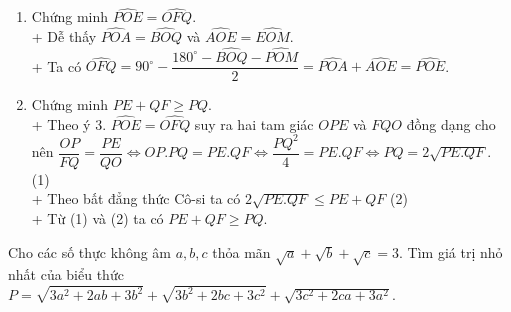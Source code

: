 \begin{ex}
{\begin{enumerate}
+ Từ (1) và (2) ta có $CH.CO = CM.CN$.
\item  Chứng minh $\widehat {POE} =\widehat{OFQ}$. \\
+ Dễ thấy $\widehat{POA}=\widehat{BOQ}$ và $\widehat{AOE} = \widehat{EOM}$. \\
+ Ta có $\widehat{OFQ} = 90^{\circ} - \dfrac{180^{\circ} - \widehat{BOQ}-  \widehat{POM}}{2} = 
\widehat{POA} + \widehat{AOE} = \widehat{POE}$. 
\item Chứng minh  $PE +QF \geq PQ$. \\
+ Theo ý 3. $\widehat {POE} =\widehat{OFQ}$ suy ra hai tam giác $OPE$ và $FQO$ đồng dạng cho nên 
$\dfrac{OP}{FQ} = \dfrac{PE}{QO} \iff  OP.PQ = PE.QF \iff \dfrac{PQ^2}{4} = PE.QF \iff PQ = 2\sqrt{PE.QF}. $
  (1) \\
+ Theo bất đẳng thức Cô-si ta có $2\sqrt{PE.QF} \leq PE+QF$ (2) \\
+ Từ (1) và (2) ta có $PE +QF \geq PQ$.
\end{enumerate}
}
\end{ex}

\begin{ex}%
Cho các số thực không âm $a, b, c$ thỏa mãn $\sqrt{a} + \sqrt{b} +\sqrt{c} =3$. Tìm giá trị nhỏ
nhất của biểu thức $P = \sqrt{3a^2+2ab+3b^2} + \sqrt{3b^2+2bc+3c^2} + \sqrt{3c^2+2ca+3a^2}$. 
\end{ex}
